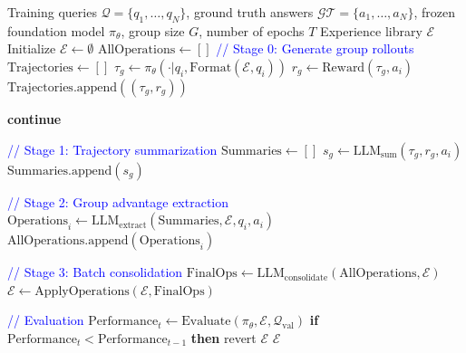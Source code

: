 \begin{algorithm}[H]
\caption{Training-Free Group Relative Policy Optimization}
\label{alg:tfgrpo}
\begin{algorithmic}[1]
\REQUIRE Training queries $\mathcal{Q} = \{q_1, \ldots, q_N\}$, ground truth answers $\mathcal{GT} = \{a_1, \ldots, a_N\}$, frozen foundation model $\pi_\theta$, group size $G$, number of epochs $T$
\ENSURE Experience library $\mathcal{E}$
\STATE Initialize $\mathcal{E} \leftarrow \emptyset$
    \STATE $\text{AllOperations} \leftarrow []$
        \STATE \textcolor{blue}{// Stage 0: Generate group rollouts}
        \STATE $\text{Trajectories} \leftarrow []$
            \STATE $\tau_g \leftarrow \pi_\theta(\cdot | q_i, \text{Format}(\mathcal{E}, q_i))$ 
            \STATE $r_g \leftarrow \text{Reward}(\tau_g, a_i)$ 
            \STATE $\text{Trajectories}.\text{append}((\tau_g, r_g))$
        \ENDFOR

            \STATE \textbf{continue} 
        \ENDIF

        \STATE \textcolor{blue}{// Stage 1: Trajectory summarization}
        \STATE $\text{Summaries} \leftarrow []$
            \STATE $s_g \leftarrow \text{LLM}_{\text{sum}}(\tau_g, r_g, a_i)$ 
            \STATE $\text{Summaries}.\text{append}(s_g)$
        \ENDFOR

        \STATE \textcolor{blue}{// Stage 2: Group advantage extraction}
        \STATE $\text{Operations}_i \leftarrow \text{LLM}_{\text{extract}}(\text{Summaries}, \mathcal{E}, q_i, a_i)$
        \STATE $\text{AllOperations}.\text{append}(\text{Operations}_i)$
    \ENDFOR

    \STATE \textcolor{blue}{// Stage 3: Batch consolidation}
    \STATE $\text{FinalOps} \leftarrow \text{LLM}_{\text{consolidate}}(\text{AllOperations}, \mathcal{E})$
    \STATE $\mathcal{E} \leftarrow \text{ApplyOperations}(\mathcal{E}, \text{FinalOps})$

    \STATE \textcolor{blue}{// Evaluation}
    \STATE $\text{Performance}_t \leftarrow \text{Evaluate}(\pi_\theta, \mathcal{E}, \mathcal{Q}_{\text{val}})$
    \STATE \textbf{if} $\text{Performance}_t < \text{Performance}_{t-1}$ \textbf{then} revert $\mathcal{E}$
\ENDFOR
\RETURN $\mathcal{E}$
\end{algorithmic}
\end{algorithm}


